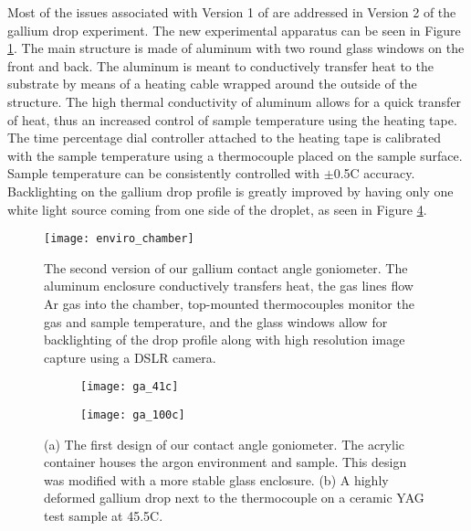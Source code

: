 Most of the issues associated with Version 1 of are addressed in Version 2 of the gallium drop experiment. The new experimental apparatus can be seen in Figure \ref{fig:enviro_chamber}. The main structure is made of aluminum with two round glass windows on the front and back. The aluminum is meant to conductively transfer heat to the substrate by means of a heating cable wrapped around the outside of the structure. The high thermal conductivity of aluminum allows for a quick transfer of heat, thus an increased control of sample temperature using the heating tape. The time percentage dial controller attached to the heating tape is calibrated with the sample temperature using a thermocouple placed on the sample surface. Sample temperature can be consistently controlled with $\pm$0.5\degree C accuracy. Backlighting on the gallium drop profile is greatly improved by having only one white light source coming from one side of the droplet, as seen in Figure \ref{fig:deformed_ga}.

\begin{figure}
	\centering
		\texttt{[image: enviro\_chamber]}
	\caption{The second version of our gallium contact angle goniometer. The aluminum enclosure conductively transfers heat, the gas lines flow Ar gas into the chamber, top-mounted thermocouples monitor the gas and sample temperature, and the glass windows allow for backlighting of the drop profile along with high resolution image capture using a DSLR camera.}
	\label{fig:enviro_chamber}
\end{figure}

\begin{figure}
	\centering
	\begin{subfigure}[c]{0.45\textwidth}
		\texttt{[image: ga\_41c]}
		\subcaption{~}
		\label{fig:ga_41c}		
	\end{subfigure}
	\begin{subfigure}[c]{0.47\textwidth} 
		\texttt{[image: ga\_100c]}
		\subcaption{~}
		\label{fig:ga_100c}		
	\end{subfigure}
	\caption{(a) The first design of our contact angle goniometer.  The acrylic container houses the argon environment and sample.  This design was modified with a more stable glass enclosure. (b) A highly deformed gallium drop next to the thermocouple on a ceramic YAG test sample at 45.5\degree C.}
	\label{fig:deformed_ga}
\end{figure}

